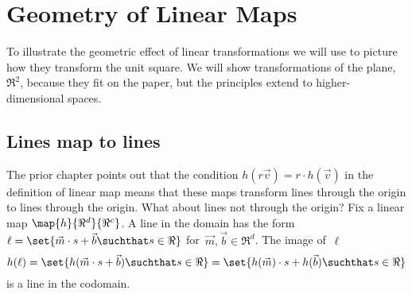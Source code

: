 \chapter{Geometry of Linear Maps}

To illustrate the geometric effect of linear transformations 
we will use \Sage to picture how they transform the unit square.
We will show transformations of the plane,~$\Re^2$,
because they fit on the paper, but the principles extend to 
higher-dimensional spaces.




\section{Lines map to lines}
The prior chapter points out that 
the condition $h(r\vec{v})=r\cdot h(\vec{v})$ in the definition
of linear map means that
these maps transform lines through the origin to lines through the origin.
What about lines not through the origin?
Fix a linear map $\map{h}{\Re^d}{\Re^c}$.
A line in the domain has the form 
$\ell = \set{\vec{m}\cdot s +\vec{b}\suchthat s\in\Re}$
for~$\vec{m}, \vec{b}\in\Re^d$.
The image of~$\ell$
\begin{equation*}
  h(\ell)=\set{h(\vec{m}\cdot s+\vec{b})\suchthat s\in\Re}
  =\set{h(\vec{m})\cdot s+h(\vec{b})\suchthat s\in\Re}
\end{equation*}
is a line in the codomain. 

